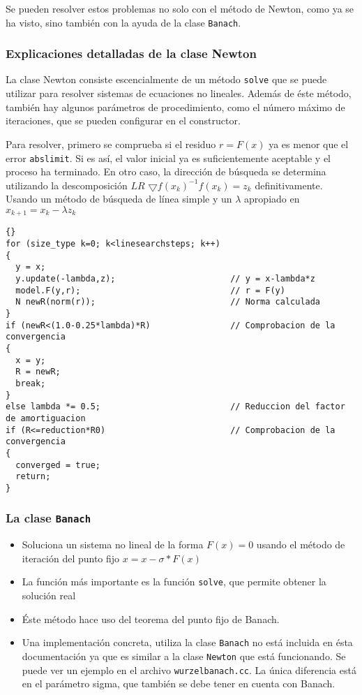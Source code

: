 \documentclass[a4paper,11pt]{article}
\theoremstyle{definition}
\begin{document}
Se pueden resolver estos problemas no solo con el método de Newton, como ya se ha visto, sino también con la ayuda de la clase \lstinline{Banach}.

\subsubsection{Explicaciones detalladas de la clase Newton}
La clase Newton consiste escencialmente de un método \lstinline{solve} que se puede
utilizar para resolver sistemas de ecuaciones no lineales. Además de éste método,
también hay algunos parámetros de procedimiento, como el número máximo de iteraciones,
que se pueden configurar en el constructor.

Para resolver, primero se comprueba si el residuo $r=F(x)$ ya es menor que el error \lstinline{abslimit}. Si es así, el valor inicial ya es suficientemente aceptable y el proceso ha terminado. En otro caso, la dirección de búsqueda se determina utilizando la descomposición $LR$ 
$\bigtriangledown f(x_k)^{-1}f(x_k) = z_k$ definitivamente.  Usando un método de búsqueda de línea
simple y un $\lambda$ apropiado en $x_{k+1}=x_k-\lambda z_k$

{\footnotesize{\begin{lstlisting}{}
for (size_type k=0; k<linesearchsteps; k++)
{
  y = x;
  y.update(-lambda,z);                       // y = x-lambda*z
  model.F(y,r);                              // r = F(y)
  N newR(norm(r));                           // Norma calculada
}
if (newR<(1.0-0.25*lambda)*R)                // Comprobacion de la convergencia
{
  x = y;
  R = newR;
  break;
}
else lambda *= 0.5;                          // Reduccion del factor de amortiguacion
if (R<=reduction*R0)                         // Comprobacion de la convergencia
{
  converged = true;
  return;
}
\end{lstlisting}}}


\subsubsection{La clase \lstinline{Banach}}
\begin{itemize}
\item Soluciona un sistema no lineal de la forma $F(x)=0$ usando el método de iteración del punto fijo $x = x - \sigma*F(x)$
\item La función más importante es la función \lstinline{solve}, que permite obtener la solución real
\item Éste método hace uso del teorema del punto fijo de Banach.
\item Una implementación concreta, utiliza la clase \lstinline{Banach} 
no está incluida en ésta documentación ya que es similar a la clase
  \lstinline{Newton} que está funcionando. Se puede ver un ejemplo en el archivo
  \lstinline{wurzelbanach.cc}. La única diferencia está en el parámetro sigma, que también se debe tener en cuenta con Banach.
\end{itemize}
\end{document}
